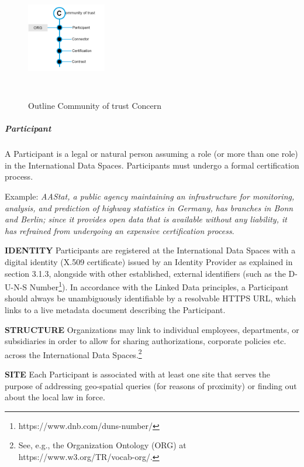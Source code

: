 \begin{figure}[H]
	\begin{Center}
		\includegraphics[width=1.36in,height=2.12in]{./media/image48.png}
		\caption{Outline Community of trust Concern}
		\label{fig:community_of_trust_concern}
	\end{Center}
\end{figure}


\subparagraph*{Participant}
A Participant is a legal or natural person assuming a role (or more than one role) in the International Data Spaces. Participants must undergo a formal certification process.  

Example: \textit{AAStat, a public agency maintaining an infrastructure for monitoring, analysis, and prediction of highway statistics in Germany, has branches in Bonn and Berlin; since it provides open data that is available without any liability, it has refrained from undergoing an expensive certification process}.

\textbf{IDENTITY} Participants are registered at the International Data Spaces with a digital identity (X.509 certificate) issued by an Identity Provider as explained in section 3.1.3,
alongside with other established, external identifiers (such as the D-U-N-S Number\footnote{https://www.dnb.com/duns-number/ }). In accordance with the Linked Data principles, a Participant should always be unambiguously identifiable by a resolvable HTTPS URL, which links to a live metadata document describing the Participant.

\textbf{STRUCTURE} Organizations may link to individual employees, departments, or subsidiaries in order to allow for sharing authorizations, corporate policies etc. across the International Data Spaces.\footnote{See, e.g., the Organization Ontology (ORG) at https://www.w3.org/TR/vocab-org/.}

\textbf{SITE} Each Participant is associated with at least one site that serves the purpose of addressing geo-spatial queries (for reasons of proximity) or finding out about the local law in force. 

